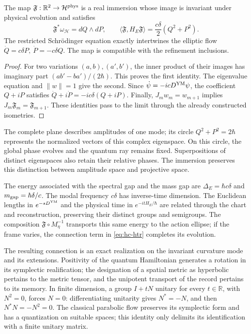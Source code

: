 \begin{theorem}
\label{thm:hc-ym-oscillator}
The map \(\mathfrak F:\mathbb R^2\to\mathcal H^{\rm phys}\)
is a real immersion whose image is invariant under physical evolution and
satisfies
\begin{equation}
 \mathfrak F^*\omega_{\mathcal H}=dQ\wedge dP,
 \qquad
 \langle\mathfrak F,H_E\mathfrak F\rangle
 =\frac{c\delta}{2}(Q^2+P^2).
 \label{eq:hc-ym-energy-pullback}
\end{equation}
The restricted Schrödinger equation exactly intertwines the elliptic
flow \(\dot Q=c\delta P,\ \dot P=-c\delta Q\).
The map is compatible with the refinement inclusions.
\end{theorem}
\begin{proof}
For two variations \((a,b),(a',b')\), the inner product of their
images has imaginary part \((ab'-ba')/(2\hbar)\).
This proves the first identity. The eigenvalue equation and \(\|w\|=1\)
give the second. Since
\(\dot\psi=-icD^{\rm YM}\psi\), the coefficient \(Q+iP\)
satisfies \(\dot Q+i\dot P=-ic\delta(Q+iP)\).
Finally, \(J_mw_m=w_{m+1}\) implies
\(J_m\mathfrak F_m=\mathfrak F_{m+1}\). These identities pass to the
limit through the already constructed isometries.
\end{proof}

The complete plane describes amplitudes of one mode; its circle
\(Q^2+P^2=2\hbar\) represents the normalized vectors of this
complex eigenspace. On this circle, the global phase evolves and the
quantum ray remains fixed. Superpositions of distinct eigenspaces
also retain their relative phases. The immersion preserves this
distinction between amplitude space and projective space.

The energy associated with the spectral gap and the mass gap are
\(\Delta_E=\hbar c\delta\) and \(m_{\rm gap}=\hbar\delta/c\).
The modal frequency \(c\delta\) has inverse-time dimension.
The Euclidean lengths in \(e^{-sD^{\rm YM}}\) and the physical time
in \(e^{-itH_E/\hbar}\) are related through the chart and
reconstruction, preserving their distinct groups and semigroups.
The composition \(\mathfrak F\circ M_\eta^{-1}\) transports this
same energy to the action ellipse; if the frame varies, the connection
term in \eqref{eq:hc-htr} completes its evolution.

The resulting connection is an exact realization on the invariant curvature
mode and its extensions. Positivity of the quantum Hamiltonian
generates a rotation in its symplectic realification; the designation
of a spatial metric as hyperbolic pertains to the metric tensor, and the
unipotent transport of the record pertains to its memory. In finite
dimension, a group \(I+tN\) unitary for every \(t\in\mathbb R\), with
\(N^2=0\), forces \(N=0\): differentiating unitarity gives \(N^*=-N\),
and then \(N^*N=-N^2=0\). The classical parabolic flow preserves its
symplectic form and has a quantization on suitable spaces; this
identity only delimits its identification with a finite unitary matrix.

